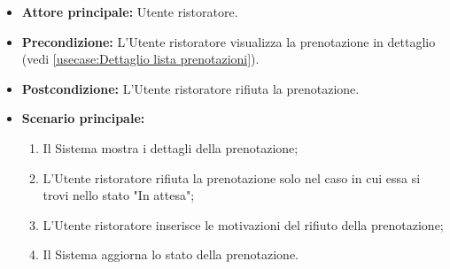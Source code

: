 \label{usecase:Rifiuta prenotazione}
\begin{itemize}
	\item \textbf{Attore principale:} Utente ristoratore.

	\item \textbf{Precondizione:} L'Utente ristoratore visualizza la prenotazione in dettaglio (vedi \autoref{usecase:Dettaglio lista prenotazioni}).

	\item \textbf{Postcondizione:} L'Utente ristoratore rifiuta la prenotazione.



	\item \textbf{Scenario principale:}
	      \begin{enumerate}
		      \item Il Sistema mostra i dettagli della prenotazione;
		      \item L'Utente ristoratore rifiuta la prenotazione solo nel caso in cui essa si trovi nello stato "In attesa";
		      \item L'Utente ristoratore inserisce le motivazioni del rifiuto della prenotazione;
		      \item Il Sistema aggiorna lo stato della prenotazione.

	      \end{enumerate}
\end{itemize}
